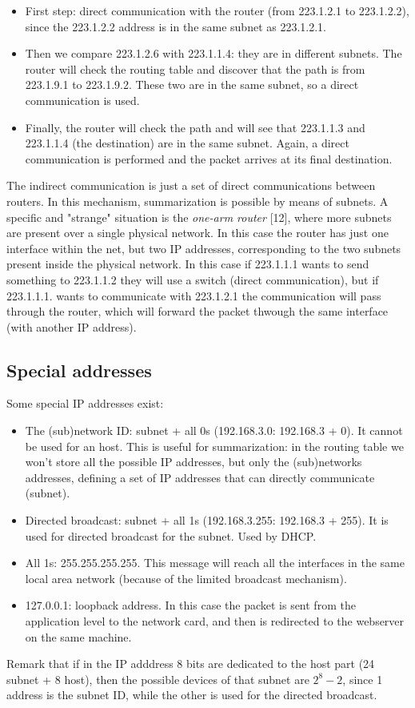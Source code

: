 \begin{itemize}
    \item First step: direct communication with the router (from 223.1.2.1 to 223.1.2.2), since the 223.1.2.2 address is in the same subnet as 223.1.2.1.
    \item Then we compare 223.1.2.6 with 223.1.1.4: they are in different subnets. The router will check the routing table and discover that the path is from 223.1.9.1 to 223.1.9.2. These two are in the same subnet, so a direct communication is used.
    \item Finally, the router will check the path and will see that 223.1.1.3 and 223.1.1.4 (the destination) are in the same subnet. Again, a direct communication is performed and the packet arrives at its final destination.
\end{itemize}
The indirect communication is just a set of direct communications between routers. In this mechanism, summarization is possible by means of subnets. A specific and "strange" situation is the \textit{one-arm router} [12], where more subnets are present over a single physical network. In this case the router has just one interface within the net, but two IP addresses, corresponding to the two subnets present inside the physical network. In this case if 223.1.1.1 wants to send something to 223.1.1.2 they will use a switch (direct communication), but if 223.1.1.1. wants to communicate with 223.1.2.1 the communication will pass through the router, which will forward the packet thwough the same interface (with another IP address).
\subsection{Special addresses}
Some special IP addresses exist:
\begin{itemize}
    \item The (sub)network ID: subnet + all 0s (192.168.3.0: 192.168.3 + 0). It cannot be used for an host. This is useful for summarization: in the routing table we won't store all the possible IP addresses, but only the (sub)networks addresses, defining a set of IP addresses that can directly communicate (subnet).
    \item Directed broadcast: subnet + all 1s (192.168.3.255: 192.168.3 + 255). It is used for directed broadcast for the subnet. Used by DHCP.
    \item All 1s: 255.255.255.255. This message will reach all the interfaces in the same local area network (because of the limited broadcast mechanism).
    \item 127.0.0.1: loopback address. In this case the packet is sent from the application level to the network card, and then is redirected to the webserver on the same machine. 
\end{itemize}
Remark that if in the IP adddress 8 bits are dedicated to the host part (24 subnet + 8 host), then the possible devices of that subnet are \(2^8-2\), since 1 address is the subnet ID, while the other is used for the directed broadcast.

